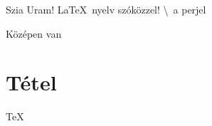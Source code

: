 \documentclass{article}
\begin{document}
	Szia Uram! \LaTeX\ nyelv szóközzel!
	\textbackslash\ a perjel
	\begin{center}
		Középen van
		\end{center}
	\section{Tétel}
	TeX
	
\end{document}
